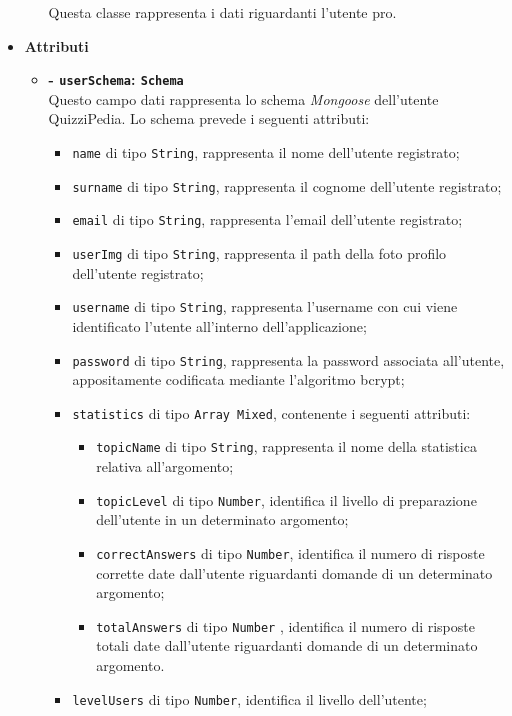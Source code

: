 \begin{itemize}
\begin{itemize}
			Questa classe rappresenta i dati riguardanti l'utente pro.
		\end{itemize}
	\item \textbf{Attributi} 
		\begin{itemize}
			\item \textbf{- \texttt{userSchema}: \texttt{Schema}} \\
			Questo campo dati rappresenta lo schema \textit{Mongoose} dell'utente QuizziPedia. Lo schema prevede i seguenti attributi:
			\begin{itemize}
				\item 
					\texttt{name} di tipo \texttt{String}, rappresenta il nome  dell'utente registrato;
				\item 
					\texttt{surname} di tipo \texttt{String}, rappresenta il cognome  dell'utente registrato;
				\item 
					\texttt{email} di tipo \texttt{String}, rappresenta l'email  dell'utente registrato;
				\item 
					\texttt{userImg} di tipo \texttt{String}, rappresenta il path della foto profilo dell'utente registrato;
				\item 
					\texttt{username} di tipo \texttt{String}, rappresenta l'username con cui viene identificato l'utente all'interno dell'applicazione;		
				\item
					\texttt{password} di tipo \texttt{String}, rappresenta la password associata all'utente,  appositamente codificata mediante l'algoritmo bcrypt;  		
				\item
					\texttt{statistics} di tipo \texttt{Array Mixed}, contenente i seguenti attributi:
				\begin{itemize}
					\item
						\texttt{topicName} di tipo \texttt{String}, rappresenta il nome della statistica relativa all'argomento;	 
					\item
						 \texttt{topicLevel} di tipo \texttt{Number}, identifica il livello di preparazione dell'utente in un determinato argomento;
					\item
						\texttt{correctAnswers} di tipo \texttt{Number}, identifica il numero di risposte corrette date dall'utente riguardanti domande di un determinato argomento; 
					\item						
						 \texttt{totalAnswers} di tipo \texttt{Number} , identifica il numero di risposte totali date dall'utente riguardanti domande di un determinato argomento.		
				\end{itemize}		
				\item 
					\texttt{levelUsers} di tipo \texttt{Number}, identifica il livello dell'utente;				
				

\end{itemize}
\end{itemize}
\end{itemize}
